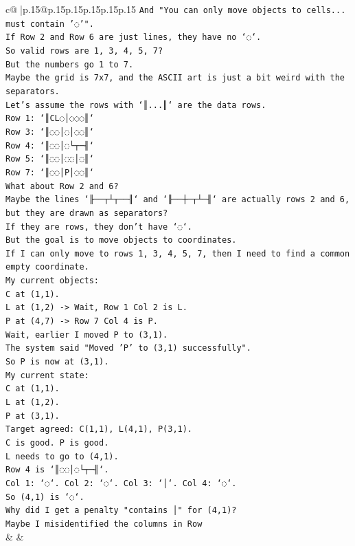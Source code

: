 \documentclass{article}
\begin{document}
{\begin{supertabular}{c@{$\;$}|p{.15\linewidth}@{}p{.15\linewidth}p{.15\linewidth}p{.15\linewidth}p{.15\linewidth}p{.15\linewidth}}
{{{\texttt{And "You can only move objects to cells... must contain '◌'".} \\
\texttt{If Row 2 and Row 6 are just lines, they have no `◌`.} \\
\texttt{So valid rows are 1, 3, 4, 5, 7?} \\
\texttt{But the numbers go 1 to 7.} \\
\texttt{Maybe the grid is 7x7, and the ASCII art is just a bit weird with the separators.} \\
\texttt{Let's assume the rows with `║...║` are the data rows.} \\
\texttt{Row 1: `║CL◌│◌◌◌║`} \\
\texttt{Row 3: `║◌◌│◌│◌◌║`} \\
\texttt{Row 4: `║◌◌│◌└┬─╢`} \\
\texttt{Row 5: `║◌◌│◌◌│◌║`} \\
\texttt{Row 7: `║◌◌│P│◌◌║`} \\
\texttt{What about Row 2 and 6?} \\
\texttt{Maybe the lines `╟──┬┴┬──╢` and `╟──┼─┬┴─╢` are actually rows 2 and 6, but they are drawn as separators?} \\
\texttt{If they are rows, they don't have `◌`.} \\
\texttt{But the goal is to move objects to coordinates.} \\
\texttt{If I can only move to rows 1, 3, 4, 5, 7, then I need to find a common empty coordinate.} \\
\texttt{My current objects:} \\
\texttt{C at (1,1).} \\
\texttt{L at (1,2) {-}> Wait, Row 1 Col 2 is L.} \\
\texttt{P at (4,7) {-}> Row 7 Col 4 is P.} \\
\texttt{Wait, earlier I moved P to (3,1).} \\
\texttt{The system said "Moved 'P' to (3,1) successfully".} \\
\texttt{So P is now at (3,1).} \\
\texttt{My current state:} \\
\texttt{C at (1,1).} \\
\texttt{L at (1,2).} \\
\texttt{P at (3,1).} \\
\texttt{Target agreed: C(1,1), L(4,1), P(3,1).} \\
\texttt{C is good. P is good.} \\
\texttt{L needs to go to (4,1).} \\
\texttt{Row 4 is `║◌◌│◌└┬─╢`.} \\
\texttt{Col 1: `◌`. Col 2: `◌`. Col 3: `│`. Col 4: `◌`.} \\
\texttt{So (4,1) is `◌`.} \\
\texttt{Why did I get a penalty "contains │" for (4,1)?} \\
\texttt{Maybe I misidentified the columns in Row} \\
            }
        }
    }
    & & \\ \\


\end{supertabular}}
\end{document}
